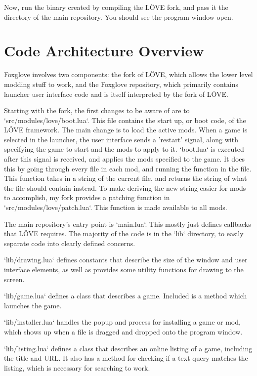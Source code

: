 \documentclass[10pt,twocolumn]{article}
\begin{document}
Now, run the binary created by compiling the LÖVE fork, and pass it
the directory of the main repository. You should see the program
window open.

\section{Code Architecture Overview}

Foxglove involves two components: the fork of LÖVE, which allows
the lower level modding stuff to work, and the Foxglove repository,
which primarily contains launcher user interface code and is itself
interpreted by the fork of LÖVE.

Starting with the fork, the first changes to be aware of are to
`src/modules/love/boot.lua`. This file contains the start up, or boot code,
of the LÖVE framework. The main change is to load the active mods.
When a game is selected in the launcher, the user interface sends a 'restart'
signal, along with specifying the game to start and the mods to apply to it.
`boot.lua` is executed after this signal is received, and applies the mods
specified to the game. It does this by going through every file in each mod,
and running the function in the file. This function takes in a string of the
current file, and returns the string of what the file should contain instead.
To make deriving the new string easier for mods to accomplish, my fork
provides a patching function in `src/modules/love/patch.lua`.
This function is made available to all mods.

The main repository's entry point is `main.lua`. This mostly just defines
callbacks that LÖVE requires. The majority of the code is in the `lib`
directory, to easily separate code into clearly defined concerns.

`lib/drawing.lua` defines constants that describe the size of the window
and user interface elements, as well as provides some utility functions
for drawing to the screen.

`lib/game.lua` defines a class that describes a game. Included is a method
which launches the game.

`lib/installer.lua` handles the popup and process
for installing a game or mod, which
shows up when a file is dragged and dropped onto the program window.

`lib/listing.lua` defines a class that describes an online listing
of a game, including the title and URL. It also has a method for checking
if a text query matches the listing, which is necessary for searching
to work.
\end{document}
